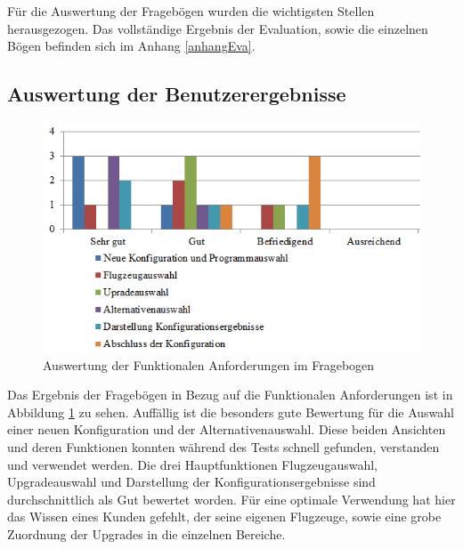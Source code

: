 Für die Auswertung der Fragebögen wurden die wichtigsten Stellen herausgezogen. Das vollständige Ergebnis der Evaluation, sowie die einzelnen Bögen befinden sich im Anhang \ref{anhangEva}.


\subsection{Auswertung der Benutzerergebnisse}
\begin{figure}[H]
\centering
\includegraphics[width=\hsize]{images/bewertung_tablet}
\caption{Auswertung der Funktionalen Anforderungen im Fragebogen}
\label{bewertungTablet}
\end{figure}
Das Ergebnis der Fragebögen in Bezug auf die Funktionalen Anforderungen ist in Abbildung \ref{bewertungTablet} zu sehen. Auffällig ist die besonders gute Bewertung für die Auswahl einer neuen Konfiguration und der Alternativenauswahl. Diese beiden Ansichten und deren Funktionen konnten während des Tests schnell gefunden, verstanden und verwendet werden. Die drei Hauptfunktionen Flugzeugauswahl, Upgradeauswahl und Darstellung der Konfigurationsergebnisse sind durchschnittlich als Gut bewertet worden. Für eine optimale Verwendung hat hier das Wissen eines Kunden gefehlt, der seine eigenen Flugzeuge, sowie eine grobe Zuordnung der Upgrades in die einzelnen Bereiche. \par

